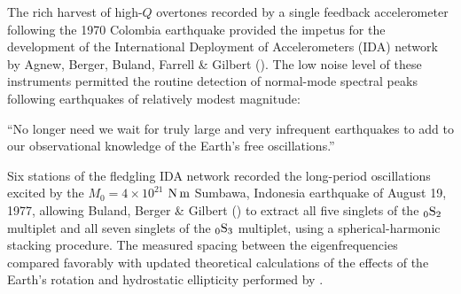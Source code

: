 The rich harvest of high-$Q$ overtones recorded by a single
feedback accelerometer following the 1970 Colombia earthquake
provided the impetus for the development of the International
Deployment of Accelerometers (IDA)
%
network by Agnew,
Berger, Buland, Farrell \& Gilbert (\citeyear{agnew&al76}).  The low
noise level of these instruments permitted the routine detection
of normal-mode spectral peaks following earthquakes of relatively
modest magnitude:
\vspace{1.0 mm}
\begin{center}
\begin{minipage}{3.7in}
``No longer need we wait for truly large and very infrequent
earthquakes to add to our observational knowledge of the
Earth's free oscillations.''
\end{minipage}
\end{center}
\vspace{1.0 mm}
Six stations of the fledgling IDA network recorded the long-period
oscillations excited by the $M_0=4\times 10^{21}$ ${\rm N}\,{\rm m}$
Sumbawa, Indonesia earthquake of August 19, 1977,
%
allowing Buland,
Berger \& Gilbert (\citeyear{buland&al79}) to extract
all five singlets of the ${}_0{\rm S}_2$ multiplet
and all seven singlets of the ${}_0{\rm S}_3$
multiplet, using a spherical-harmonic stacking procedure.
The measured spacing between the eigenfrequencies compared
favorably with updated theoretical calculations
of the effects of the Earth's rotation and hydrostatic
ellipticity performed by \textcite{dahlen&sailor79}.


